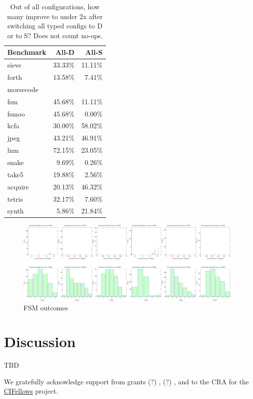 \documentclass[acmsmall,review,anonymous]{acmart}
\begin{document}
\begin{table}[t]
  \caption{Out of all configurations, how many improve to under 2x after switching all typed configs to D or to S?
  Does not count no-ops.}
  \label{t:micros}
  \begin{tabular}{lrr}
    Benchmark & All-D & All-S \\\midrule
    sieve & 33.33\% & 11.11\% \\
    forth & 13.58\% & 7.41\% \\
    morsecode & & \\
    fsm & 45.68\% & 11.11\% \\
    fsmoo & 45.68\% & 0.00\% \\
    kcfa & 30.00\% & 58.02\% \\
    jpeg & 43.21\% & 46.91\% \\
    lnm & 72.15\% & 23.05\% \\
    snake & 9.69\% & 0.26\% \\
    take5 & 19.88\% & 2.56\% \\
    acquire & 20.13\% & 46.32\% \\
    tetris & 32.17\% & 7.60\% \\
    synth & 5.86\% & 21.84\% \\
  \end{tabular}

\end{table}

\begin{figure}[t]
  \includegraphics[width=\columnwidth]{img/sample.png}
  \caption{FSM outcomes}
  \label{f:sample}
\end{figure}


\section{Discussion}
\label{s:conclusion}
\label{s:discussion}



\begin{acks}
  TBD

We gratefully acknowledge support from
 grants
  (?) \href{"https://www.nsf.gov/awardsearch/showAward?AWD_ID=1763922"}{},
  (?) \href{"https://www.nsf.gov/awardsearch/showAward?AWD_ID=1823244"}{},
 and
 \href{"https://www.nsf.gov/awardsearch/showAward?AWD_ID=2030859"}{}
  to the CRA for the \href{https://cifellows2020.org}{CIFellows} project.
\end{acks}



\end{document}
